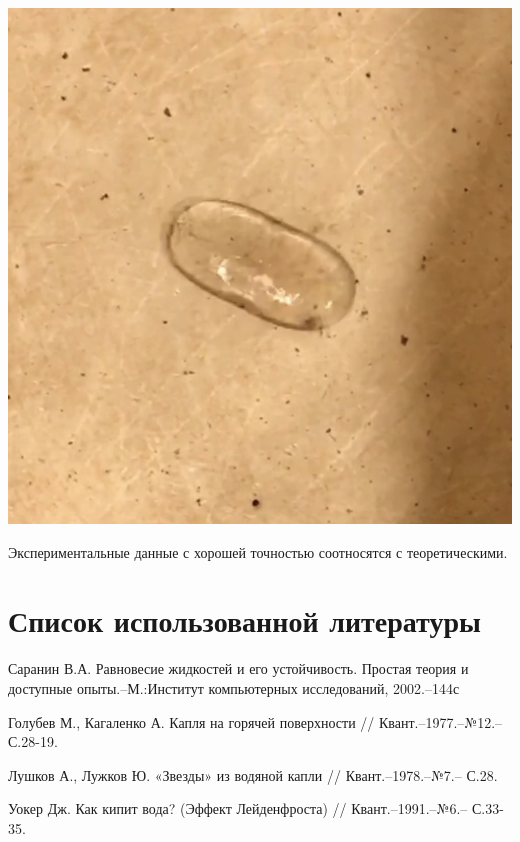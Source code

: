 \documentclass[a4paper,12pt]{article} %
\begin{document}
\begin{center}
  \includegraphics[scale={0.2}]{капля.png}
\end{center}


\medskip

\noindent Экспериментальные данные с хорошей точностью соотносятся с теоретическими.





\section{Список использованной литературы}

\noindent Саранин В.А. Равновесие жидкостей и его устойчивость. Простая теория и доступные опыты.–М.:Институт компьютерных исследований, 2002.–144с

\medskip

\noindent Голубев М., Кагаленко А. Капля на горячей поверхности // Квант.–1977.–№12.– С.28-19.

\medskip

\noindent Лушков А., Лужков Ю. «Звезды» из водяной капли // Квант.–1978.–№7.– С.28.


\medskip

\noindent Уокер Дж. Как кипит вода? (Эффект Лейденфроста) // Квант.–1991.–№6.– С.33-35.
\end{document}
